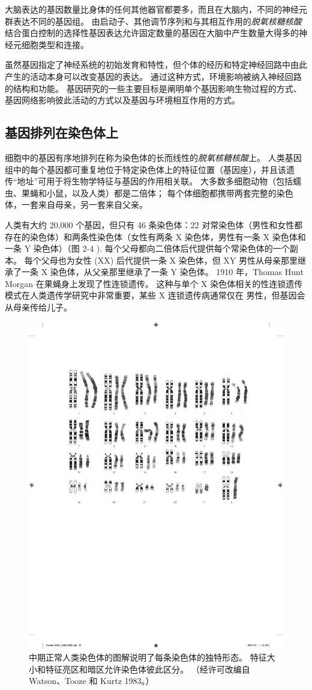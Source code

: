 大脑表达的基因数量比身体的任何其他器官都要多，而且在大脑内，不同的神经元群表达不同的基因组。 
由启动子、其他调节序列和与其相互作用的\textit{脱氧核糖核酸}结合蛋白控制的选择性基因表达允许固定数量的基因在大脑中产生数量大得多的神经元细胞类型和连接。


虽然基因指定了神经系统的初始发育和特性，但个体的经历和特定神经回路中由此产生的活动本身可以改变基因的表达。 
通过这种方式，环境影响被纳入神经回路的结构和功能。
基因研究的一些主要目标是阐明单个基因影响生物过程的方式、基因网络影响彼此活动的方式以及基因与环境相互作用的方式。



\subsection{基因排列在染色体上}

细胞中的基因有序地排列在称为染色体的长而线性的\textit{脱氧核糖核酸}上。 
人类基因组中的每个基因都可重复地位于特定染色体上的特征位置（基因座），并且该遗传“地址”可用于将生物学特征与基因的作用相关联。 
大多数多细胞动物（包括蠕虫、果蝇和小鼠，以及人类）都是二倍体； 
每个体细胞都携带两套完整的染色体，一套来自母亲，另一套来自父亲。


人类有大约 20,000 个基因，但只有 46 条染色体：22 对常染色体（男性和女性都存在的染色体）和两条性染色体（女性有两条 X 染色体，男性有一条 X 染色体和一条 Y 染色体）（图 2-4 ). 每个父母都向二倍体后代提供每个常染色体的一个副本。 
每个父母也为女性 (XX) 后代提供一条 X 染色体，但 XY 男性从母亲那里继承了一条 X 染色体，从父亲那里继承了一条 Y 染色体。 
1910 年，Thomas Hunt Morgan 在果蝇身上发现了性连锁遗传。
这种与单个 X 染色体相关的性连锁遗传模式在人类遗传学研究中非常重要，某些 X 连锁遗传病通常仅在 男性，但基因会从母亲传给儿子。

\begin{figure}[htbp]
	\centering
	\includegraphics[width=0.5\linewidth]{chap02/fig_2_4}
	\caption{中期正常人类染色体的图解说明了每条染色体的独特形态。 
		特征大小和特征亮区和暗区允许染色体彼此区分。 
		（经许可改编自 Watson、Tooze 和 Kurtz 1983。）}
	\label{fig:2_4}
\end{figure}



